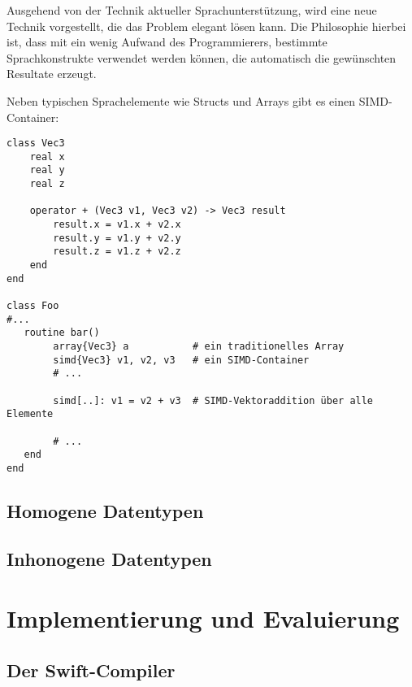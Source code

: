 \documentclass[a4paper,10pt]{article}
\begin{document}
Ausgehend von der Technik aktueller Sprachunterstützung, wird eine neue Technik vorgestellt, die das Problem
elegant lösen kann. Die Philosophie hierbei ist, dass mit ein wenig Aufwand des Programmierers, bestimmte
Sprachkonstrukte verwendet werden können, die automatisch die gewünschten Resultate erzeugt.

Neben typischen Sprachelemente wie Structs und Arrays gibt es einen SIMD-Container:

\begin{verbatim}
class Vec3
    real x
    real y
    real z

    operator + (Vec3 v1, Vec3 v2) -> Vec3 result
        result.x = v1.x + v2.x
        result.y = v1.y + v2.y
        result.z = v1.z + v2.z
    end
end

class Foo
#...
   routine bar()
        array{Vec3} a           # ein traditionelles Array
        simd{Vec3} v1, v2, v3   # ein SIMD-Container
        # ...

        simd[..]: v1 = v2 + v3  # SIMD-Vektoraddition über alle Elemente

        # ...
   end
end

\end{verbatim}

\subsection{Homogene Datentypen}

\subsection{Inhonogene Datentypen}

\section{Implementierung und Evaluierung}

\subsection{Der Swift-Compiler}
\end{document}
